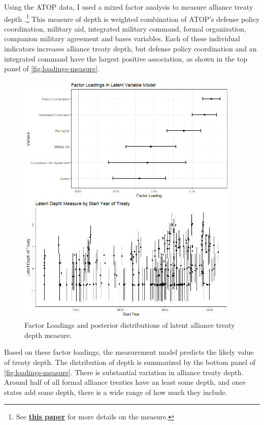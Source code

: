 \documentclass[12pt]{article}
\begin{document}
Using the ATOP data, I used a mixed factor analysis to measure alliance treaty depth \citep{Murrayetal2013}.\footnote{See \textbf{\href{https://github.com/joshuaalley/arms-allies/blob/master/manuscript/arms-allies-paper.pdf}{this paper}} for more details on the measure.}
This measure of depth is weighted combination of ATOP's defense policy coordination, military aid, integrated military command, formal organization, companion military agreement and bases variables. 
Each of these individual indicators increases alliance treaty depth, but defense policy coordination and an integrated command have the largest positive association, as shown in the top panel of \autoref{fig:loadings-measure}. 


\begin{figure}[hbtp]
\centering
\includegraphics[width=0.95\textwidth]{../figures/loadings-measure.png}
\caption{Factor Loadings and posterior distributions of latent alliance treaty depth measure.}
\label{fig:loadings-measure}
\end{figure}

Based on these factor loadings, the measurement model predicts the likely value of treaty depth. 
The distribution of depth is summarized by the bottom panel of \autoref{fig:loadings-measure}. 
There is substantial variation in alliance treaty depth. 
Around half of all formal alliance treaties have an least some depth, and once states add some depth, there is a wide range of how much they include.
\end{document}
